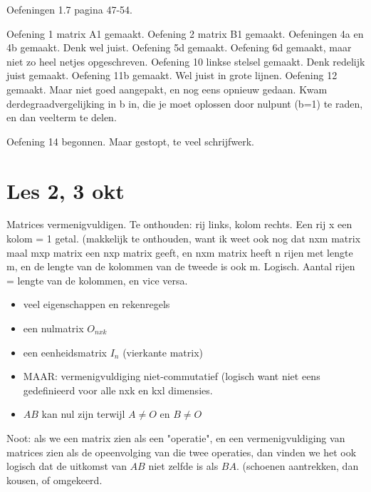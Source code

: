 \documentclass{article}
\begin{document}
Oefeningen 1.7 pagina 47-54. 

Oefening 1 matrix A1 gemaakt. 
Oefening 2 matrix B1 gemaakt. 
Oefeningen 4a en 4b gemaakt. Denk wel juist. 
Oefening 5d gemaakt. 
Oefening 6d gemaakt, maar niet zo heel netjes opgeschreven. 
Oefening 10 linkse stelsel gemaakt. Denk redelijk juist gemaakt. 
Oefening 11b gemaakt. Wel juist in grote lijnen. 
Oefening 12 gemaakt. Maar niet goed aangepakt, en nog eens opnieuw gedaan. Kwam derdegraadvergelijking in b in, die je moet oplossen door nulpunt (b=1) te raden, en dan veelterm te delen. 



Oefening 14 begonnen. Maar gestopt, te veel schrijfwerk. 


\section{Les 2, 3 okt}


Matrices vermenigvuldigen. Te onthouden: rij links, kolom rechts. Een rij x een kolom = 1 getal. (makkelijk te onthouden, want ik weet ook nog dat nxm matrix maal mxp matrix een nxp matrix geeft, en nxm matrix heeft n rijen met lengte m, en de lengte van de kolommen van de tweede is ook m. Logisch. Aantal rijen = lengte van de kolommen, en vice versa. 

% 


\begin{itemize}
    \item veel eigenschappen en rekenregels
    \item een nulmatrix $O_{nxk}$
    \item een eenheidsmatrix $I_n$ (vierkante matrix) 
    \item MAAR: vermenigvuldiging niet-commutatief (logisch want niet eens gedefinieerd voor alle nxk en kxl dimensies. 
    \item $AB$ kan nul zijn terwijl $A \neq O$ en $B \neq O$
\end{itemize}


Noot: als we een matrix zien als een "operatie", en een vermenigvuldiging van matrices zien als de opeenvolging van die twee operaties, dan vinden we het ook logisch dat de uitkomst van $AB$ niet zelfde is als $BA$. (schoenen aantrekken, dan kousen, of omgekeerd. 
\end{document}
